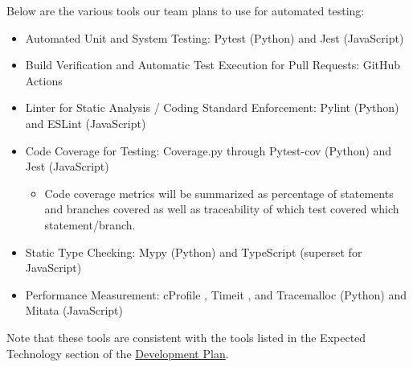 \documentclass[12pt, titlepage]{article}
\renewcommand{\wss}[1]{}
\begin{document}
\wss{What tools are you using for automated testing.  Likely a unit testing
  framework and maybe a profiling tool, like ValGrind.  Other possible tools
  include a static analyzer, make, continuous integration tools, test coverage
  tools, etc.  Explain your plans for summarizing code coverage metrics.
  Linters are another important class of tools.  For the programming language
  you select, you should look at the available linters.  There may also be tools
  that verify that coding standards have been respected, like flake9 for
  Python.}

\wss{If you have already done this in the development plan, you can point to
that document.}

\wss{The details of this section will likely evolve as you get closer to the
  implementation.}

Below are the various tools our team plans to use for automated testing:

\begin{itemize}
  \item Automated Unit and System Testing: Pytest (Python) \citet{Pytest} and Jest (JavaScript) \citet{Jest}
  \item Build Verification and Automatic Test Execution for Pull Requests: GitHub Actions
  \item Linter for Static Analysis / Coding Standard Enforcement: Pylint (Python) \citet{Pylint} and ESLint (JavaScript) \citet{ESLint}
  \item Code Coverage for Testing: Coverage.py through Pytest-cov (Python) \citet{Pytest-cov} and Jest (JavaScript) \citet{Jest}
  \begin{itemize}
    \item Code coverage metrics will be summarized as percentage of statements and branches covered as well as traceability of which test covered which statement/branch.
  \end{itemize}
  \item Static Type Checking: Mypy (Python) \citet{Mypy} and TypeScript (superset for JavaScript) \citet{Typescript}
  \item Performance Measurement: cProfile \citet{cProfile}, Timeit \citet{Timeit}, and Tracemalloc \citet{Tracemalloc} (Python) and Mitata \citet{Mitata} (JavaScript)
\end{itemize}

Note that these tools are consistent with the tools listed in the Expected Technology section of the \href{https://github.com/Jacob-MB/magic-8/blob/main/pdfs/DevelopmentPlan/DevelopmentPlan.pdf}{Development Plan}.
\end{document}
